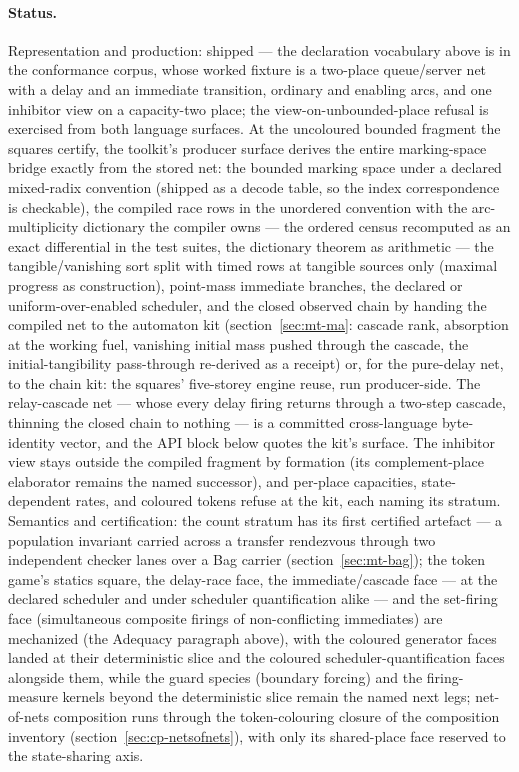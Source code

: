 \paragraph{Status.} Representation and production: shipped --- the
declaration vocabulary above is in the conformance corpus, whose
worked fixture is a two-place queue/server net with a delay and an
immediate transition, ordinary and enabling arcs, and one inhibitor
view on a capacity-two place; the view-on-unbounded-place refusal is
exercised from both language surfaces. At the uncoloured bounded
fragment the squares certify, the toolkit's producer surface derives
the entire marking-space bridge exactly from the stored net: the
bounded marking space under a declared mixed-radix convention
(shipped as a decode table, so the index correspondence is
checkable), the compiled race rows in the unordered convention with
the arc-multiplicity dictionary the compiler owns --- the ordered
census recomputed as an exact differential in the test suites, the
dictionary theorem as arithmetic --- the tangible/vanishing sort
split with timed rows at tangible sources only (maximal progress as
construction), point-mass immediate branches, the declared or
uniform-over-enabled scheduler, and the closed observed chain by
handing the compiled net to the automaton kit
(section~\ref{sec:mt-ma}: cascade rank, absorption at the working
fuel, vanishing initial mass pushed through the cascade, the
initial-tangibility pass-through re-derived as a receipt) or, for
the pure-delay net, to the chain kit: the squares' five-storey
engine reuse, run producer-side. The relay-cascade net --- whose
every delay firing returns through a two-step cascade, thinning the
closed chain to nothing --- is a committed cross-language
byte-identity vector, and the API block below quotes the kit's
surface. The inhibitor view stays outside the compiled fragment by
formation (its complement-place elaborator remains the named
successor), and per-place capacities, state-dependent rates, and
coloured tokens refuse at the kit, each naming its stratum.
Semantics and certification: the count
stratum has its first certified artefact --- a population invariant
carried across a transfer rendezvous through two independent checker
lanes over a Bag carrier (section~\ref{sec:mt-bag}); the token game's
statics square, the delay-race face, the immediate/cascade face
--- at the declared scheduler and under scheduler quantification
alike --- and the set-firing face (simultaneous composite firings of
non-conflicting immediates) are mechanized (the Adequacy paragraph
above), with the coloured generator faces landed at their
deterministic slice and the coloured scheduler-quantification faces
alongside them, while the guard species (boundary forcing) and the
firing-measure kernels beyond the deterministic slice
remain the named next legs; net-of-nets composition
runs through the token-colouring closure
of the composition inventory
(section~\ref{sec:cp-netsofnets}), with only its shared-place face
reserved to the state-sharing axis.

